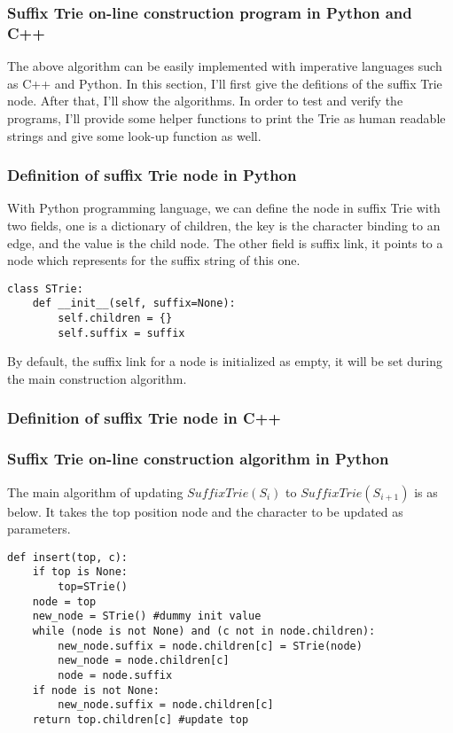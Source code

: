 \documentclass{article}
\begin{document}
\subsubsection{Suffix Trie on-line construction program in Python and C++}
The above algorithm can be easily implemented with imperative languages such as C++ and Python.
In this section, I'll first give the defitions of the suffix Trie node. After that, I'll
show the algorithms. In order to test and verify the programs, I'll provide some helper
functions to print the Trie as human readable strings and give some look-up function as well.

\subsubsection*{Definition of suffix Trie node in Python}
With Python programming language, we can define the node in suffix Trie with two fields, one
is a dictionary of children, the key is the character binding to an edge, and the value
is the child node. The other field is suffix link, it points to a node which represents for
the suffix string of this one.

\lstset{language=Python}
\begin{lstlisting}
class STrie:
    def __init__(self, suffix=None):
        self.children = {}
        self.suffix = suffix
\end{lstlisting}

By default, the suffix link for a node is initialized as empty, it will be set during the 
main construction algorithm.

\subsubsection*{Definition of suffix Trie node in C++}

\subsubsection*{Suffix Trie on-line construction algorithm in Python}
The main algorithm of updating $SuffixTrie(S_i)$ to $SuffixTrie(S_{i+1})$ is as below.
It takes the top position node and the character to be updated as parameters.

\lstset{language=Python}
\begin{lstlisting}
def insert(top, c):
    if top is None:
        top=STrie()
    node = top
    new_node = STrie() #dummy init value
    while (node is not None) and (c not in node.children):
        new_node.suffix = node.children[c] = STrie(node)
        new_node = node.children[c]
        node = node.suffix
    if node is not None:
        new_node.suffix = node.children[c]
    return top.children[c] #update top
\end{lstlisting}
\end{document}
